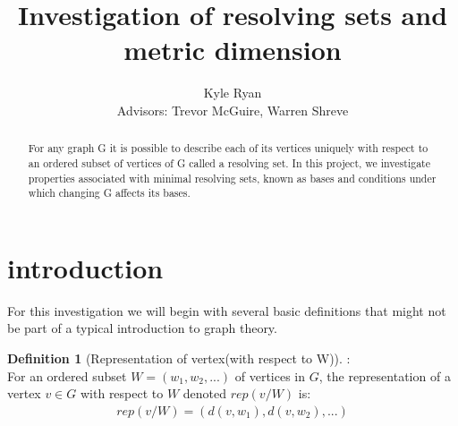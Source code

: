 \documentclass[11pt]{amsart}
\theoremstyle{plain}  %
\theoremstyle{definition}
\newtheorem{defin}[thm]{{Definition}}
\theoremstyle{remark}
\numberwithin{equation}{thm}
\begin{document}
\title[Investigation of resolving sets and metric dimension]{Investigation of resolving sets and metric dimension}
\author[K.~ R. Ryan]{Kyle Ryan\\{Advisors: Trevor McGuire, Warren Shreve}}


\address{Department of Mathematics 2750\\ North Dakota State University\\PO BOX 6050\\ Fargo, ND 58108-6050\\ USA}






\maketitle


\begin{abstract}
        For any graph G it is possible to describe each of its vertices uniquely with respect to an ordered subset of vertices of G called a resolving set.
    In this project, we investigate properties associated with minimal resolving sets, known as bases and conditions under which changing G affects its bases. 
\end{abstract}


\section{introduction}

    For this investigation we will begin with several basic definitions that might not be part of a typical introduction to graph theory.

 \begin{defin}[Representation of vertex(with respect to W)]:\\
    For an ordered subset $W=(w_1, w_2, ...)$ of vertices in $G$, the representation of a vertex $v \in G$ with respect to $W$ denoted $rep(v/W)$ is:
  \begin{align*}
  rep(v/W)=(d(v,w_1), d(v,w_2), ...)
  \end{align*}
 \end{defin}
    
\end{document}
